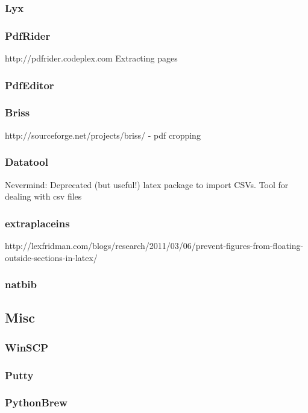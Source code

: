 \documentclass[a4paper,11pt]{report}
\begin{document}
\subsubsection*{Lyx}




\subsubsection*{PdfRider}
http://pdfrider.codeplex.com
Extracting pages
\subsubsection*{PdfEditor}
\subsubsection*{Briss}
http://sourceforge.net/projects/briss/ - pdf cropping
\subsubsection*{Datatool}
Nevermind: Deprecated (but useful!) latex package to import CSVs.
Tool for dealing with csv files

\subsubsection*{extraplaceins}
http://lexfridman.com/blogs/research/2011/03/06/prevent-figures-from-floating-outside-sections-in-latex/

\subsubsection*{natbib}

\subsection{Misc}
\subsubsection*{WinSCP}

\subsubsection*{Putty}

\subsubsection*{PythonBrew}
\end{document}
